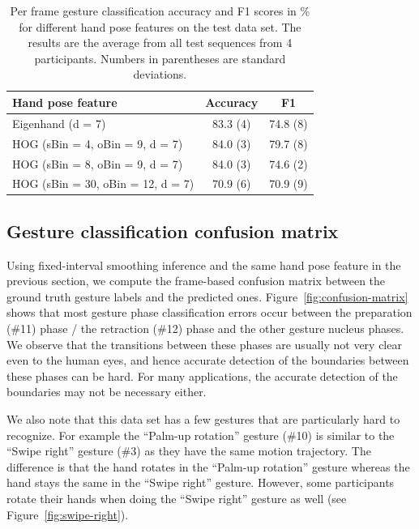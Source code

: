 \documentclass{acm_proc_article-sp}
\begin{document}
\begin{table}[tb]
\begin{center}
\caption{Per frame gesture classification accuracy and F1 scores in \% for different
hand pose features on the test data set. The results are the average from all test
sequences from 4 participants. Numbers in parentheses are standard deviations.}
\label{tab:comp-feature}
\begin{tabular}{|l|c|c|}
\hline
\textbf{Hand pose feature} & \textbf{Accuracy} & \textbf{F1} \\
\hline
Eigenhand (d = 7) & 83.3 (4) & 74.8 (8) \\ 
\hline
HOG (sBin = 4, oBin = 9, d = 7) & 84.0 (3) & 79.7 (8)\\
\hline
HOG (sBin = 8, oBin = 9, d = 7) & 84.0 (3) & 74.6 (2)\\
\hline
HOG (sBin = 30, oBin = 12, d = 7) & 70.9 (6) & 70.9 (9)\\
\hline
\end{tabular}
\end{center}
\end{table}

\subsection{Gesture classification confusion matrix}
Using fixed-interval smoothing inference and the same hand pose feature in the previous
section, we compute the frame-based confusion matrix
between the ground truth gesture labels and the predicted ones. Figure~\ref{fig:confusion-matrix} shows that most gesture phase classification errors
occur between the preparation (\#11) phase / the retraction (\#12) phase and the other gesture nucleus phases. We
observe that the transitions between these phases are usually
not very clear even to the human eyes, and hence accurate detection of the boundaries between these
phases can be hard. For many applications, the accurate detection of the boundaries may not be
necessary either.

We also note that this data set has a few gestures that are particularly hard to recognize.
For example the ``Palm-up rotation'' gesture (\#10) is similar to the ``Swipe right'' gesture (\#3) as they 
have the same motion trajectory. The difference is that the hand rotates in the ``Palm-up rotation'' gesture whereas the 
hand stays the same in the ``Swipe right'' gesture. However, some participants rotate their hands when doing
the ``Swipe right'' gesture as well (see Figure~\ref{fig:swipe-right}).
\end{document}
